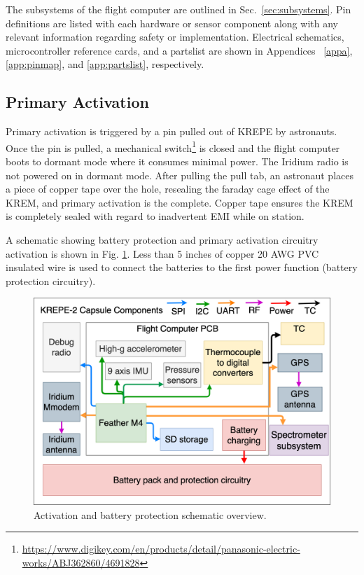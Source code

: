 \documentclass{article}
\begin{document}
The subsystems of the flight computer are outlined in Sec.~\ref{sec:subsystems}. Pin definitions are listed with each hardware or sensor component along with any relevant information regarding safety or implementation. Electrical schematics, microcontroller reference cards, and a partslist are shown in  Appendices ~\ref{appa}, \ref{app:pinmap}, and \ref{app:partslist}, respectively.


\subsection{Primary Activation}
\label{sec:primary-activation}
Primary activation is triggered by a pin pulled out of KREPE by astronauts. Once the pin is pulled, a mechanical switch\footnote{\url{https://www.digikey.com/en/products/detail/panasonic-electric-works/ABJ362860/4691828}} is closed and the flight computer boots to dormant mode where it consumes minimal power. The Iridium radio is not powered on in dormant mode. After pulling the pull tab, an astronaut places a piece of copper tape over the hole, resealing the faraday cage effect of the KREM, and primary activation is the complete. Copper tape ensures the KREM is completely sealed with regard to inadvertent EMI while on station.

A schematic showing battery protection and primary activation circuitry activation is shown in Fig. \ref{fig:activation-circuitry}. Less than 5 inches of copper 20 AWG PVC insulated wire is used to connect the batteries to the first power function (battery protection circuitry).




\begin{figure}[H]
    \centering
    \includegraphics[width=12cm]{images/krepe2-avionics.png}
    \caption{Activation and battery protection schematic overview.}
    \label{fig:activation-circuitry}
\end{figure}
\end{document}
